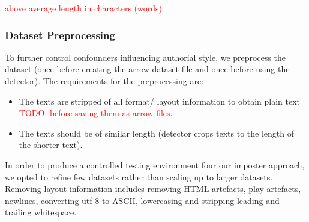 \begin{table}[h]
\centering\small
\caption{Statistics of preprocessed datasets \dataPan{}, \dataBlog{} and \dataGutenberg{}.}
\label{tab:data_stats}
\end{table}
\textcolor{red}{above average length in characters (words)}


\subsubsection{Dataset Preprocessing}
\label{subsubsec:dataset_preprocessing}

To further control confounders influencing authorial style, we preprocess the dataset 
(once before creating the arrow dataset file and once before using the detector).
The requirements for the preprocessing are:
\begin{itemize}
    \item The texts are stripped of all format/ layout information to obtain plain text \textcolor{red}{TODO: before saving them as arrow files}.
    \item The texts should be of similar length (detector crops texts to the length of the shorter text).
\end{itemize}
In order to produce a controlled testing environment four our imposter approach, 
we opted to refine few datasets rather than scaling up to larger datasets.
Removing layout information includes removing HTML artefacts, play artefacts, newlines, 
converting utf-8 to ASCII, lowercasing and stripping leading and trailing whitespace.

